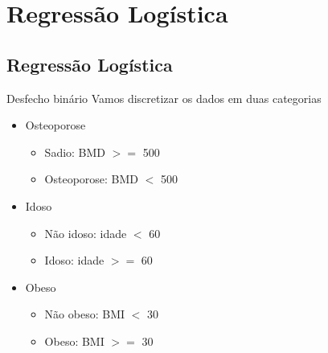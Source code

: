 \documentclass{beamer}
\begin{document}
\section{Regressão Logística}

\subsection{Regressão Logística}

\begin{frame}{\scriptsize Desfecho binário}
  \scriptsize
  Vamos discretizar os dados em duas categorias
  \bigskip
  \begin{itemize}
    \footnotesize
  \item Osteoporose
    \begin{itemize}
      \scriptsize
    \item Sadio: BMD $>=$ 500
    \item Osteoporose: BMD $<$ 500
    \end{itemize}
  \bigskip
  \item Idoso
    \begin{itemize}
      \scriptsize
    \item Não idoso: idade $<$ 60
    \item Idoso: idade $>=$ 60
    \end{itemize}
  \bigskip
  \item Obeso
    \begin{itemize}
      \scriptsize
    \item Não obeso: BMI $<$ 30
    \item Obeso: BMI $>=$ 30
    \end{itemize}
  \end{itemize}
\end{frame}
\end{document}
